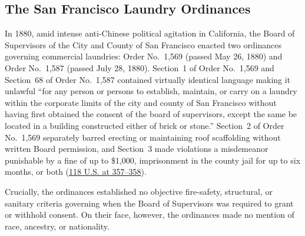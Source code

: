 \documentclass[12pt]{article}
\begin{document}
\subsection{The San Francisco Laundry Ordinances}
In 1880, amid intense anti-Chinese political agitation in California, the Board of Supervisors of the City and County of San Francisco enacted two ordinances governing commercial laundries: Order No.~1,569 (passed May 26, 1880) and Order No.~1,587 (passed July 28, 1880). Section~1 of Order No.~1,569 and Section~68 of Order No.~1,587 contained virtually identical language making it unlawful ``for any person or persons to establish, maintain, or carry on a laundry within the corporate limits of the city and county of San Francisco without having first obtained the consent of the board of supervisors, except the same be located in a building constructed either of brick or stone.'' Section~2 of Order No.~1,569 separately barred erecting or maintaining roof scaffolding without written Board permission, and Section~3 made violations a misdemeanor punishable by a fine of up to \$1,000, imprisonment in the county jail for up to six months, or both (\href{https://www.law.cornell.edu/supremecourt/text/118/356}{118 U.S. at 357--358}).

Crucially, the ordinances established no objective fire-safety, structural, or sanitary criteria governing when the Board of Supervisors was required to grant or withhold consent. On their face, however, the ordinances made no mention of race, ancestry, or nationality.
\end{document}
